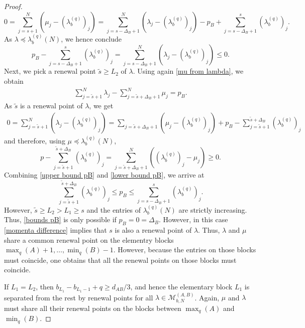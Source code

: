 \documentclass[letterpaper, DIV=17]{scrartcl}
\numberwithin{equation}{section}
\theoremstyle{definition}
\begin{document}
\begin{proof}
\begin{equation}
		0 = \sum_{j=s+1}^N (\mu_j-(\lambda_b^{(q)})_j)
		= \sum_{j=s-\Delta_B+1}^N (\lambda_j-(\lambda_b^{(q)})_j) -p_B + \sum_{j=s-\Delta_B+1}^s (\lambda_b^{(q)})_j.
	\end{equation}
	As $\lambda \preceq \lambda_b^{(q)}(N)$, we hence conclude
	\begin{equation} \label{upper bound pB}
		p_B - \sum_{j=s-\Delta_B+1}^s (\lambda_b^{(q)})_j = \sum_{j=s-\Delta_B+1}^N (\lambda_j-(\lambda_b^{(q)})_j) \leq 0.
	\end{equation}
	Next, we pick a renewal point $\tilde{s}\geq L_2$ of $\lambda$. Using again \eqref{mu from lambda}, we obtain
	\begin{align*}
		\sum_{j=\tilde{s}+1}^N \lambda_j - \sum_{j=\tilde{s}+\Delta_B+1}^N \mu_j = p_B.
	\end{align*}
	As $\tilde{s}$ is a renewal point of $\lambda$, we get
	\begin{align*}
		0 = \sum_{j=\tilde{s}+1}^N (\lambda_j-(\lambda_b^{(q)})_j)
		= \sum_{j=\tilde{s}+\Delta_B+1} (\mu_j -(\lambda_b^{(q)})_j) + p_B -\sum_{j=\tilde{s}+1}^{\tilde{s}+\Delta_B} (\lambda_b^{(q)})_j
	\end{align*}
	and therefore, using $\mu \preceq \lambda_b^{(q)}(N)$, 
	\begin{equation} \label{lower bound pB}
		p-\sum_{j=\tilde{s}+1}^{\tilde{s}+\Delta_B} (\lambda_b^{(q)})_j = \sum_{j=\tilde{s}+\Delta_B+1}^N ((\lambda_b^{(q)})_j-\mu_j) \geq 0.
	\end{equation}
	Combining \eqref{upper bound pB} and \eqref{lower bound pB}, we arrive at
	\begin{equation} \label{bounds pB}
		\sum_{j=\tilde{s}+1}^{\tilde{s}+\Delta_B} (\lambda_b^{(q)})_j \leq p_B \leq \sum_{j=s-\Delta_B+1}^s (\lambda_b^{(q)})_j.
	\end{equation}
	However, $\tilde{s}\geq L_2>L_1\geq s$ and the entries of $\lambda_b^{(q)}(N)$ are strictly increasing. Thus, \eqref{bounds pB} is only possible if $p_B=0=\Delta_B$. However, in this case \eqref{momenta difference} implies that $s$ is also a renewal point of $\lambda$. Thus, $\lambda$ and $\mu$ share a common renewal point  on the elementry blocks $ \max_q(A)+1, \dots , \min_q(B)-1$. However, because the entries on those blocks must coincide, one obtains that all the renewal points on those blocks must coincide.
	
	If $L_1=L_2$, then $
		b_{L_1}-b_{L_1-1} +q  \geq d_{AB}/3 $, and hence the elementary block $ L_1 $ is separated from the rest by renewal points for all
	$\lambda\in \mathcal{M}_{b,N}^{(A,B)}$. Again, $\mu$ and $\lambda$ must share all their renewal points on the blocks between $ \max_q(A)$ and $  \min_q(B)$. 
	

\end{proof}
\end{document}
